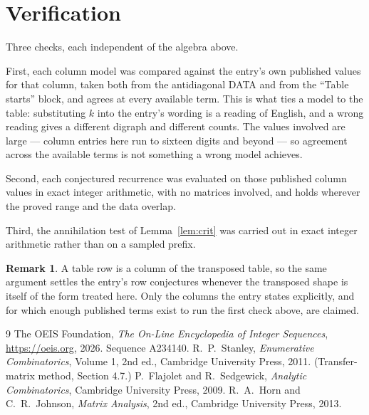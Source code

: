 \documentclass[11pt,a4paper]{article}
\theoremstyle{plain}
\theoremstyle{definition}
\newtheorem{remark}[theorem]{Remark}
\begin{document}
\section{Verification}

Three checks, each independent of the algebra above.

First, each column model was compared against the entry's own published values for that
column, taken both from the antidiagonal DATA and from the ``Table starts'' block, and agrees
at every available term. This is what ties a model to the table: substituting $k$ into the
entry's wording is a reading of English, and a wrong reading gives a different digraph and
different counts. The values involved are large --- column entries here run to sixteen digits
and beyond --- so agreement across the available terms is not something a wrong model
achieves.

Second, each conjectured recurrence was evaluated on those published column values in exact
integer arithmetic, with no matrices involved, and holds wherever the proved range and the
data overlap.

Third, the annihilation test of Lemma~\ref{lem:crit} was carried out in exact integer
arithmetic rather than on a sampled prefix.

\begin{remark}
A table row is a column of the transposed table, so the same argument settles the entry's row
conjectures whenever the transposed shape is itself of the form treated here. Only the columns
the entry states explicitly, and for which enough published terms exist to run the first check
above, are claimed.
\end{remark}

\begin{thebibliography}{9}
 The OEIS Foundation, \emph{The On-Line Encyclopedia of Integer
Sequences}, \url{https://oeis.org}, 2026. Sequence A234140.
 R.~P.~Stanley, \emph{Enumerative Combinatorics}, Volume 1, 2nd ed.,
Cambridge University Press, 2011. (Transfer-matrix method, Section 4.7.)
 P.~Flajolet and R.~Sedgewick, \emph{Analytic Combinatorics}, Cambridge
University Press, 2009.
 R.~A.~Horn and C.~R.~Johnson, \emph{Matrix Analysis}, 2nd ed., Cambridge
University Press, 2013.
\end{thebibliography}
\end{document}
